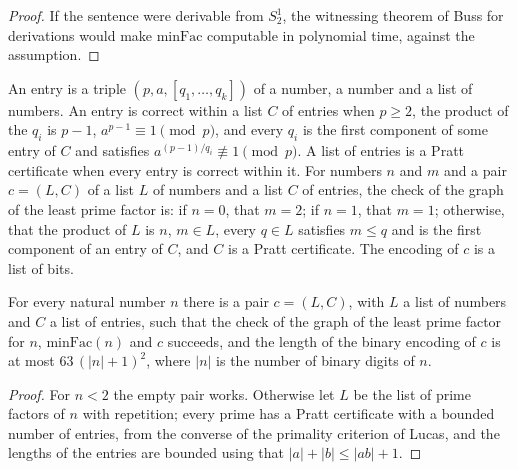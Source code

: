 \begin{proof}
  \leanok
  If the sentence were derivable from $S^1_2$, the witnessing theorem of Buss for derivations would
  make $\mathrm{minFac}$ computable in polynomial time, against the assumption.
\end{proof}

\begin{definition}
  \label{def:arithmetic-pratt}
  \leanok
  \own{}
  \infrastructure{}
  An entry is a triple $(p, a, [q_1, \dots, q_k])$ of a number, a number and a list of numbers. An
  entry is correct within a list $C$ of entries when $p \ge 2$, the product of the $q_i$ is $p - 1$,
  $a^{p-1} \equiv 1 \pmod p$, and every $q_i$ is the first component of some entry of $C$ and
  satisfies $a^{(p-1)/q_i} \not\equiv 1 \pmod p$. A list of entries is a Pratt certificate when every
  entry is correct within it. For numbers $n$ and $m$ and a pair $c = (L, C)$ of a list $L$ of
  numbers and a list $C$ of entries, the check of the graph of the least prime factor is: if $n = 0$,
  that $m = 2$; if $n = 1$, that $m = 1$; otherwise, that the product of $L$ is $n$, $m \in L$, every
  $q \in L$ satisfies $m \le q$ and is the first component of an entry of $C$, and $C$ is a Pratt
  certificate. The encoding of $c$ is a list of bits.
\end{definition}

\begin{theorem}
  \label{thm:arithmetic-pratt-cert}
  \leanok
  For every natural number $n$ there is a pair $c = (L, C)$, with $L$ a list of numbers and $C$ a list
  of entries, such that the check of the graph of the least prime factor for $n$, $\mathrm{minFac}(n)$
  and $c$ succeeds, and the length of the binary encoding of $c$ is at most $63\,(|n| + 1)^2$, where
  $|n|$ is the number of binary digits of $n$.
  \own{}
\end{theorem}

\begin{proof}
  \leanok
  For $n < 2$ the empty pair works. Otherwise let $L$ be the list of prime factors of $n$ with
  repetition; every prime has a Pratt certificate with a bounded number of entries, from the converse
  of the primality criterion of Lucas, and the lengths of the entries are bounded using that $|a| +
  |b| \le |ab| + 1$.
\end{proof}

